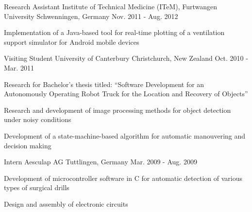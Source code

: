 \begin{cventries}
    \cventry
      {Research Assistant} %
      {Institute of Technical Medicine (ITeM), Furtwangen University} %
      {Schwenningen, Germany} %
      {Nov. 2011 - Aug. 2012} %
      {
        \begin{cvitems}
          \item {Implementation of a Java-based tool for real-time plotting of a ventilation support simulator for Android mobile devices}
        \end{cvitems}
      }

  \cventry
    {Visiting Student} %
    {University of Canterbury} %
    {Christchurch, New Zealand} %
    {Oct. 2010 - Mar. 2011} %
    {
      \begin{cvitems}
        \item {Research for Bachelor's thesis titled:} ``Software Development for an Autonomously Operating Robot Truck for the Location and Recovery of Objects''
        \item {Research and development of image processing methods for object detection under noisy conditions}
        \item {Development of a state-machine-based algorithm for automatic manouvering and decision making}
      \end{cvitems}
    }

  \cventry
  {Intern} %
  {Aesculap AG} %
  {Tuttlingen, Germany} %
  {Mar. 2009 - Aug. 2009} %
  {
    \begin{cvitems}
      \item {Development of microcontroller software in C for automatic detection of various types of surgical drills}
      \item {Design and assembly of electronic circuits}
    \end{cvitems}
  }

\end{cventries}
